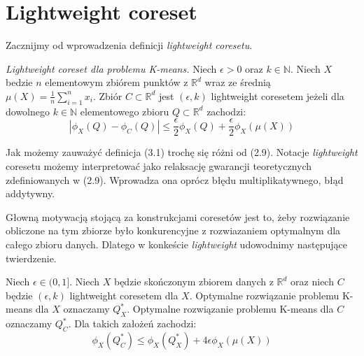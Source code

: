 \section{Lightweight coreset}

Zacznijmy od wprowadzenia definicji \textit{lightweight coresetu}.
\begin{definition}
    \emph{Lightweight coreset dla problemu K-means.} Niech $\epsilon > 0$ oraz $k \in \mathbb{N}$.
    Niech $X$ bedzie $n$ elementowym zbiórem punktów z $\mathbb{R}^{d}$ wraz ze średnią $\mu(X) = \frac{1}{n}\sum_{i=1}^{n} x_{i}$.
    Zbiór $C \subset \mathbb{R}^d$ jest $(\epsilon, k)$ lightweight coresetem jeżeli dla dowolnego $k \in \mathbb{N}$ elementowego zbioru $Q \subset \mathbb{R}^{d}$ zachodzi:
    \begin{equation}
        |\phi_{X}(Q) - \phi_{C}(Q)| \leq \frac{\epsilon}{2}\phi_{X}(Q) + \frac{\epsilon}{2}\phi_{X}(\mu(X))
    \end{equation}
\end{definition}

\noindent
Jak możemy zauważyć definicja (3.1) trochę się różni od (2.9).
Notacje \textit{lightweight} coresetu możemy interpretować jako relaksację gwarancji teoretycznych zdefiniowanych w (2.9).
Wprowadza ona oprócz błędu multiplikatywnego, błąd addytywny.

Głowną motywacją stojącą za konstrukcjami coresetów jest to, żeby rozwiązanie obliczone na tym zbiorze było konkurencyjne z rozwiazaniem optymalnym dla całego zbioru danych.
Dlatego w konkeście \textit{lightweight} udowodnimy następujące twierdzenie.

\begin{thm}{\cite{bachem2017scalable}}
    Niech $\epsilon \in (0, 1]$. Niech $X$ będzie skończonym zbiorem danych z $\mathbb{R}^d$ oraz niech $C$ będzie $(\epsilon, k)$ lightweight coresetem dla $X$.
    Optymalne rozwiązanie problemu K-means dla $X$ oznaczamy $Q_{X}^{*}$.
    Optymalne rozwiązanie problemu K-means dla $C$ oznaczamy $Q_{C}^{*}$.
    Dla takich założeń zachodzi:
    \begin{equation}
        \phi_{X}(Q_{C}^{*}) \leq \phi_{X}(Q_{X}^{*}) + 4\epsilon\phi_{X}(\mu(X))
    \end{equation}
\end{thm}

